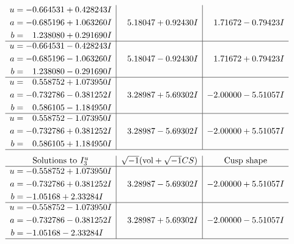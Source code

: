 \documentclass[1p]{elsarticle_modified}
\theoremstyle{definition}
\newcommand{\I}{\sqrt{-1}}
\begin{document}
$$\begin{array}{c|c|c}
\begin{aligned}
u &= -0.664531 + 0.428243 I \\
a &= -0.685196 + 1.063260 I \\
b &= \phantom{-}1.238080 + 0.291690 I\end{aligned}
 & \phantom{-}5.18047 + 0.92430 I & \phantom{-}1.71672 - 0.79423 I \\ \hline\begin{aligned}
u &= -0.664531 - 0.428243 I \\
a &= -0.685196 - 1.063260 I \\
b &= \phantom{-}1.238080 - 0.291690 I\end{aligned}
 & \phantom{-}5.18047 - 0.92430 I & \phantom{-}1.71672 + 0.79423 I \\ \hline\begin{aligned}
u &= \phantom{-}0.558752 + 1.073950 I \\
a &= -0.732786 - 0.381252 I \\
b &= \phantom{-}0.586105 - 1.184950 I\end{aligned}
 & \phantom{-}3.28987 + 5.69302 I & -2.00000 - 5.51057 I \\ \hline\begin{aligned}
u &= \phantom{-}0.558752 - 1.073950 I \\
a &= -0.732786 + 0.381252 I \\
b &= \phantom{-}0.586105 + 1.184950 I\end{aligned}
 & \phantom{-}3.28987 - 5.69302 I & -2.00000 + 5.51057 I\\
 \hline 
 \end{array}$$\newpage$$\begin{array}{c|c|c}  
\text{Solutions to }I^u_{3}& \I (\text{vol} + \sqrt{-1}CS) & \text{Cusp shape}\\
 \hline 
\begin{aligned}
u &= -0.558752 + 1.073950 I \\
a &= -0.732786 + 0.381252 I \\
b &= -1.05168 + 2.33284 I\end{aligned}
 & \phantom{-}3.28987 - 5.69302 I & -2.00000 + 5.51057 I \\ \hline\begin{aligned}
u &= -0.558752 - 1.073950 I \\
a &= -0.732786 - 0.381252 I \\
b &= -1.05168 - 2.33284 I\end{aligned}
 & \phantom{-}3.28987 + 5.69302 I & -2.00000 - 5.51057 I\\
 \hline 
 \end{array}$$\newpage
\end{document}
